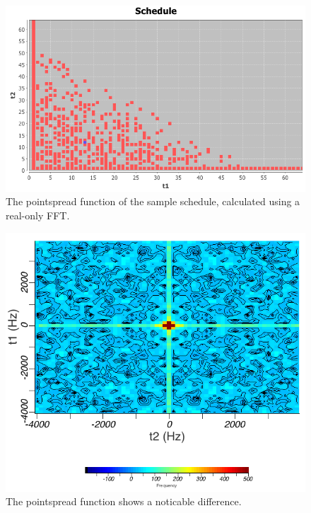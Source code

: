 \begin{figure}
  \includegraphics[scale=0.5]{figures/sched2}
  \caption{The pointspread function of the sample schedule, 
           calculated using a real-only FFT.}
  \label{sched2}
\end{figure}

\begin{figure}
  \includegraphics[scale=0.5]{figures/fft2}
  \caption{The pointspread function shows a noticable difference.}
  \label{fft2}
\end{figure}


